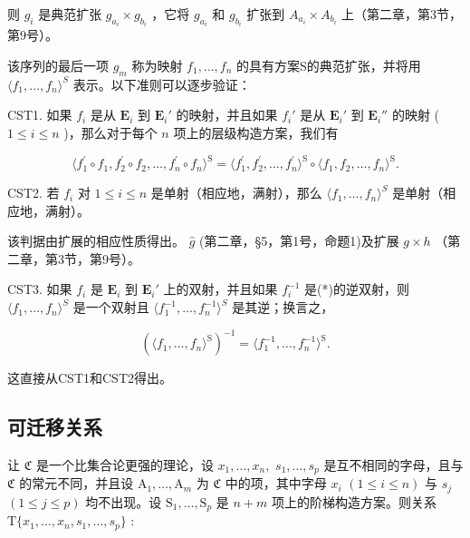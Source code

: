 则 \(g_{i}\) 是典范扩张 \(g_{a_i} \times g_{b_i}\) ，它将 \(g_{a_i}\) 和 \(g_{b_i}\) 扩张到 \(A_{a_i} \times A_{b_i}\) 上（第二章，第3节，第9号）。

该序列的最后一项 \(g_{m}\) 称为映射 \(f_{1}, \ldots, f_{n}\) 的具有方案S的典范扩张，并将用 \(\langle f_{1}, \ldots, f_{n} \rangle^{S}\) 表示。以下准则可以逐步验证：

CST1. 如果 \(f_{i}\) 是从 \(\mathbf{E}_i\) 到 \(\mathbf{E}_i'\) 的映射，并且如果 \(f_{i}'\) 是从 \(\mathbf{E}_i'\) 到 \(\mathbf{E}_i''\) 的映射 ( \(1 \leqslant i \leqslant n\) )，那么对于每个 \(n\) 项上的层级构造方案，我们有

\[
\langle f _ {1} ^ {\prime} \circ f _ {1}, f _ {2} ^ {\prime} \circ f _ {2}, \dots , f _ {n} ^ {\prime} \circ f _ {n} \rangle^ {\mathrm{S}} = \langle f _ {1} ^ {\prime}, f _ {2} ^ {\prime}, \dots , f _ {n} ^ {\prime} \rangle^ {\mathrm{S}} \circ \langle f _ {1}, f _ {2}, \dots , f _ {n} \rangle^ {\mathrm{S}}.
\]

CST2. 若 \(f_{i}\) 对 \(1 \leqslant i \leqslant n\) 是单射（相应地，满射），那么 \(\langle f_{1}, \ldots, f_{n} \rangle^{S}\) 是单射（相应地，满射）。

该判据由扩展的相应性质得出。 \(\hat{g}\) (第二章，§5，第1号，命题1)及扩展 \(g \times h\) （第二章，第3节，第9号）。

CST3. 如果 \(f_{i}\) 是 \(\mathbf{E}_i\) 到 \(\mathbf{E}_i'\) 上的双射，并且如果 \(f_{i}^{-1}\) 是(*)的逆双射，则 \(\langle f_1, \ldots, f_n \rangle^{S}\) 是一个双射且 \(\langle f_1^{-1}, \ldots, f_n^{-1} \rangle^{S}\) 是其逆；换言之，

\[
(\langle f _ {1}, \dots , f _ {n} \rangle^ {\mathrm{S}}) ^ {- 1} = \langle f _ {1} ^ {- 1}, \dots , f _ {n} ^ {- 1} \rangle^ {\mathrm{S}}.
\]

这直接从CST1和CST2得出。

\subsection{可迁移关系}

让 \(\mathfrak{C}\) 是一个比集合论更强的理论，设 \(x_{1},\ldots ,x_{n},\) \(s_1,\ldots ,s_p\) 是互不相同的字母，且与 \(\mathfrak{C}\) 的常元不同，并且设 \(\mathrm{A}_1,\ldots ,\mathrm{A}_m\) 为 \(\mathfrak{C}\) 中的项，其中字母 \(x_{i}\) \((1\leqslant i\leqslant n)\) 与 \(s_j\) \((1\leqslant j\leqslant p)\) 均不出现。设 \(\mathrm{S}_1,\ldots ,\mathrm{S}_p\) 是 \(n + m\) 项上的阶梯构造方案。则关系 \(\mathrm{T}\{x_1,\dots,x_n,s_1,\dots,s_p\}\) :

